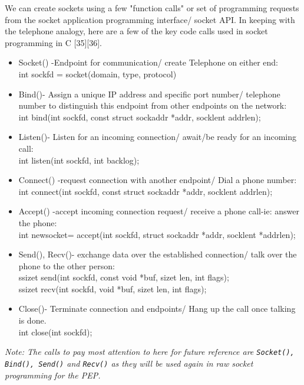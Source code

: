 \documentclass{uathesis}
\begin{document}
We can create sockets using a few "function calls" or set of programming requests from the socket application programming interface/ socket API. In keeping with the telephone analogy, here are a few of the key code calls used in socket programming in C [35][36].
   \begin{itemize}
   \item Socket() -Endpoint for communication/ create Telephone on either end:\\
   int sockfd = socket(domain, type, protocol)
   \item Bind()- Assign a unique IP address and specific port number/ telephone number to distinguish this endpoint from other endpoints on the network:\\
   int bind(int sockfd, const struct sockaddr *addr, 
                          socklen\textunderscore t addrlen);
   \item Listen()- Listen for an incoming connection/ await/be ready for an incoming call:\\
   int listen(int sockfd, int backlog);
   \item Connect() -request connection with another endpoint/ Dial a phone number:\\
   int connect(int sockfd, const struct sockaddr *addr,  
                             socklen\textunderscore t addrlen);
   \item Accept() -accept incoming connection request/ receive a phone call-ie: answer the phone:\\
   int new\textunderscore socket= accept(int sockfd, struct sockaddr *addr, socklen\textunderscore t *addrlen);
   \item Send(), Recv()- exchange data over the established connection/ talk over the phone to the other person: \\
   ssize\textunderscore t send(int sockfd, const void *buf, size\textunderscore t len, int flags);\\
   ssize\textunderscore t recv(int sockfd, void *buf, size\textunderscore t len, int flags);
   \item Close()- Terminate connection and endpoints/ Hang up the call once talking is done. \\
   int close(int sockfd);\\
   \end{itemize} 
   
\noindent \emph{Note: The calls to pay most attention to here for future reference are {\tt Socket(), Bind(), Send()} and {\tt Recv()} as they will be used again in raw socket programming for the PEP.} 
\end{document}
